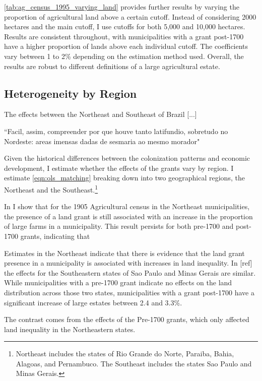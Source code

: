 \documentclass{article}
\begin{document}
\autoref{tab:ag_census_1995_varying_land} provides further results by varying the proportion of agricultural land above a certain cutoff. 
Instead of considering 2000 hectares and the main cutoff, I use cutoffs for both 5,000 and 10,000 hectares. 
Results are consistent throughout, with municipalities with a grant post-1700 have a higher proportion of lands above each individual cutoff. 
The coefficients vary between 1 to 2\% depending on the estimation method used. 
Overall, the results are robust to different definitions of a large agricultural estate.

\subsection{Heterogeneity by Region}

The effects between the Northeast and Southeast of Brazil [...]

``Facil, assim, compreender por que houve tanto latifundio, sobretudo no Nordeste: areas imensas dadas de sesmaria ao mesmo morador" \parencite[p.~53]{Da_Costa_Porto1979-dz}

Given the historical differences between the colonization patterns and economic development, I estimate whether the effects of the grants vary by region.
I estimate \autoref{eqn:ols_matching} breaking down into two geographical regions, the Northeast and the Southeast.\footnote{Northeast includes the states of Rio Grande do Norte, Paraiba, Bahia, Alagoas, and Pernambuco. The Southeast includes the states Sao Paulo and Minas Gerais.}


In \label{tab:land_1995_gini_combined} I show that for the 1905 Agricultural census in the Northeast municipalities, the presence of a land grant is still associated with an increase in the proportion of large farms in a municipality. 
This result persists for both pre-1700 and post-1700 grants, indicating that 

Estimates in the Northeast indicate that there is evidence that the land grant presence in a municipality is associated with increases in land inequality. 
In [ref] the effects for the Southeastern states of Sao Paulo and Minas Gerais are similar. 
While municipalities with a pre-1700 grant indicate no effects on the land distribution across those two states, municipalities with a grant post-1700 have a significant increase of large estates between 2.4 and 3.3\%. 

The contrast comes from the effects of the Pre-1700 grants, which only affected land inequality in the Northeastern states.
\end{document}
